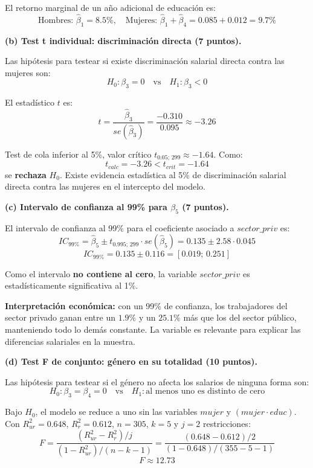 \documentclass[10pt,a4paper]{article}
\begin{document}
\begin{enumerate}
El retorno marginal de un año adicional de educación es:
\[
\text{Hombres: } \hat{\beta}_1 = 8.5\%, \quad \text{Mujeres: } \hat{\beta}_1 + \hat{\beta}_4 = 0.085 + 0.012 = 9.7\%
\]

\medskip

\textbf{(b) Test t individual: discriminación directa (7 puntos).}

Las hipótesis para testear si existe discriminación salarial directa contra las mujeres son:
\[
H_0: \beta_3 = 0 \quad \text{vs} \quad H_1: \beta_3 < 0
\]

El estadístico $t$ es:
\[
t = \frac{\hat{\beta}_3}{se(\hat{\beta}_3)} = \frac{-0.310}{0.095} \approx -3.26
\]

Test de cola inferior al 5\%, valor crítico $t_{0.05; \, 299} \approx -1.64$. Como:
\[
t_{calc} = -3.26 < t_{crit} = -1.64
\]
se \textbf{rechaza} $H_0$. Existe evidencia estadística al 5\% de discriminación salarial directa contra las mujeres en el intercepto del modelo.

\medskip

\textbf{(c) Intervalo de confianza al 99\% para $\beta_5$ (7 puntos).}

El intervalo de confianza al 99\% para el coeficiente asociado a $sector\_priv$ es:
\[
IC_{99\%} = \hat{\beta}_5 \pm t_{0.995; \, 299} \cdot se(\hat{\beta}_5) = 0.135 \pm 2.58 \cdot 0.045
\]
\[
IC_{99\%} = 0.135 \pm 0.116 = [0.019; \, 0.251]
\]

Como el intervalo \textbf{no contiene al cero}, la variable $sector\_priv$ es estadísticamente significativa al 1\%. 

\textbf{Interpretación económica:} con un 99\% de confianza, los trabajadores del sector privado ganan entre un $1.9\%$ y un $25.1\%$ más que los del sector público, manteniendo todo lo demás constante. La variable es relevante para explicar las diferencias salariales en la muestra.

\medskip

\textbf{(d) Test F de conjunto: género en su totalidad (10 puntos).}

Las hipótesis para testear si el género no afecta los salarios de ninguna forma son:
\[
H_0: \beta_3 = \beta_4 = 0 \quad \text{vs} \quad H_1: \text{al menos uno es distinto de cero}
\]

Bajo $H_0$, el modelo se reduce a uno sin las variables $mujer$ y $(mujer \cdot educ)$. Con $R^2_{ur} = 0.648$, $R^2_r = 0.612$, $n = 305$, $k = 5$ y $j = 2$ restricciones:
\[
F = \frac{(R^2_{ur} - R^2_r)/j}{(1 - R^2_{ur})/(n - k - 1)} = \frac{(0.648 - 0.612)/2}{(1 - 0.648)/(355 - 5 - 1)}
\]
\[
F \approx 12.73
\]


\end{enumerate}
\end{document}
